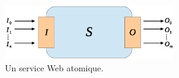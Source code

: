 \begin{figure}[h]
    \centering
    \includegraphics[width=0.65\textwidth]{figs/ch3/ws.eps}
    \caption{Un service Web atomique.}
    \label{fig:ch3/ws}
\end{figure}
